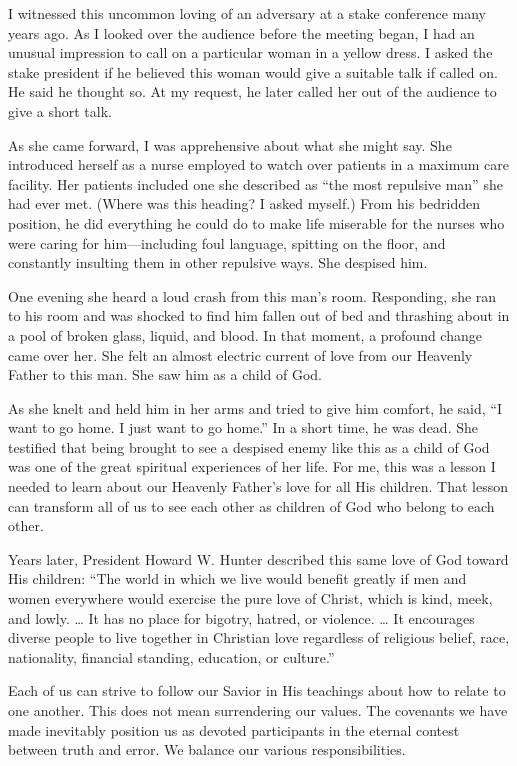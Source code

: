 \documentclass[letterpaper, 11pt]{report}
\newcommand{\intalkheader}[1]{
    \vspace{0.75em}
    \noindent{\normalsize\bfseries #1}
    \par\nopagebreak %
    \vspace{0.25em}
    \nopagebreak     %
}
\begin{document}
I witnessed this uncommon loving of an adversary at a stake conference many years ago. As I looked over the audience before the meeting began, I had an unusual impression to call on a particular woman in a yellow dress. I asked the stake president if he believed this woman would give a suitable talk if called on. He said he thought so. At my request, he later called her out of the audience to give a short talk.

As she came forward, I was apprehensive about what she might say. She introduced herself as a nurse employed to watch over patients in a maximum care facility. Her patients included one she described as “the most repulsive man” she had ever met. (Where was this heading? I asked myself.) From his bedridden position, he did everything he could do to make life miserable for the nurses who were caring for him—including foul language, spitting on the floor, and constantly insulting them in other repulsive ways. She despised him.

One evening she heard a loud crash from this man’s room. Responding, she ran to his room and was shocked to find him fallen out of bed and thrashing about in a pool of broken glass, liquid, and blood. In that moment, a profound change came over her. She felt an almost electric current of love from our Heavenly Father to this man. She saw him as a child of God.

As she knelt and held him in her arms and tried to give him comfort, he said, “I want to go home. I just want to go home.” In a short time, he was dead. She testified that being brought to see a despised enemy like this as a child of God was one of the great spiritual experiences of her life. For me, this was a lesson I needed to learn about our Heavenly Father’s love for all His children. That lesson can transform all of us to see each other as children of God who belong to each other.

Years later, President Howard W. Hunter described this same love of God toward His children: “The world in which we live would beneﬁt greatly if men and women everywhere would exercise the pure love of Christ, which is kind, meek, and lowly. … It has no place for bigotry, hatred, or violence. … It encourages diverse people to live together in Christian love regardless of religious belief, race, nationality, ﬁnancial standing, education, or culture.”

\intalkheader{III.}

Each of us can strive to follow our Savior in His teachings about how to relate to one another. This does not mean surrendering our values. The covenants we have made inevitably position us as devoted participants in the eternal contest between truth and error. We balance our various responsibilities.
\end{document}
